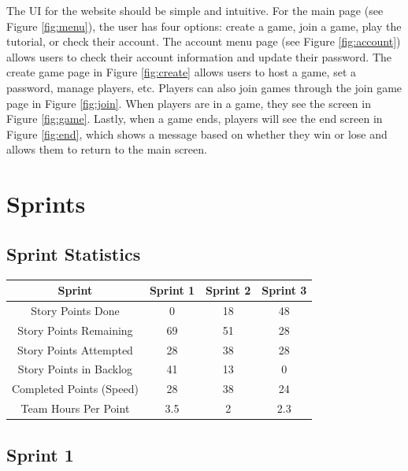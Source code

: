 \documentclass{article}
\begin{document}
The UI for the website should be simple and intuitive. For the main page (see Figure \ref{fig:menu}), the user has four options: create a game, join a game, play the tutorial, or check their account. The account menu page (see Figure \ref{fig:account}) allows users to check their account information and update their password. The create game page in Figure \ref{fig:create} allows users to host a game, set a password, manage players, etc. Players can also join games through the join game page in Figure \ref{fig:join}. When players are in a game, they see the screen in Figure \ref{fig:game}. Lastly, when a game ends, players will see the end screen in Figure \ref{fig:end}, which shows a message based on whether they win or lose and allows them to return to the main screen.

\section{Sprints}

\subsection{Sprint Statistics}
\begin{table}[h]
\centering
\begin{tabular}{|c|c|c|c|}
\hline
\textbf{Sprint}          & \textbf{Sprint 1} & \textbf{Sprint 2} & \textbf{Sprint 3} \\ \hline
Story Points Done        & 0                 & 18                & 48                \\ \hline
Story Points Remaining   & 69                & 51                & 28                \\ \hline
Story Points Attempted   & 28                & 38                & 28                \\ \hline
Story Points in Backlog  & 41                & 13                & 0                 \\ \hline
Completed Points (Speed) & 28                & 38                & 24                \\ \hline
Team Hours Per Point     & 3.5               & 2                 & 2.3               \\ \hline
\end{tabular}
\end{table}

\subsection{Sprint 1}
\end{document}
